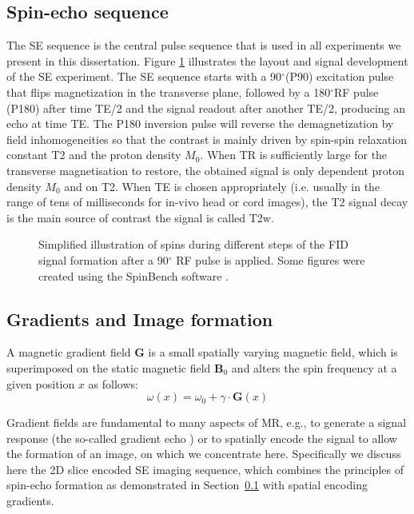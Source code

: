 \subsection{Spin-echo sequence}
\label{sec:chapter2 spin echo}
The {\gls{SE}} sequence is the central pulse sequence that is used in all experiments we present in this dissertation. Figure \ref{fig:chap2 SE sequence} illustrates the layout and signal development of the \gls{SE} experiment. The \gls{SE} sequence starts with a 90$^\circ$(P90) excitation pulse that flips magnetization in the transverse plane, followed by a 180$^\circ$RF pulse (P180) after time TE/2 and the signal readout after another TE/2, producing an echo at time TE. The P180 inversion pulse will reverse the demagnetization by field inhomogeneities so that the contrast is mainly driven by spin-spin relaxation constant T2 and the proton density $M_0$. When TR is sufficiently large for the transverse magnetisation to restore, the obtained signal is only dependent proton density $M_0$ and on T2. When TE is chosen appropriately (i.e. usually in the range of tens of milliseconds for in-vivo head or  cord images), the T2 signal decay is the main source of contrast the signal is called \gls{T2w}.

\begin{figure}[ht]
\centering
{}
\caption{Simplified illustration of spins during different steps of the FID signal formation after a 90$^\circ$ RF pulse is applied. Some figures were created using the SpinBench software \citep{Overall:2007}.}
\label{fig:chap2 SE sequence}
\end{figure}


\subsection{Gradients and Image formation}
A magnetic gradient field $\textbf{G}$ is a small spatially varying magnetic field, which is superimposed on the static magnetic field $\mathbf{B}_{0}$ and alters the spin frequency at a given position $x$ as follows:
\begin{equation}
\omega(x)= \omega_0 + \gamma \cdot \textbf{G}(x)
\end{equation}

Gradient fields are fundamental to many aspects of MR, e.g., to generate a signal response (the so-called gradient echo ) or to spatially encode the signal to allow the formation of an image, on which we concentrate here.  Specifically we discuss here the 2D slice encoded SE imaging sequence, which combines the principles of spin-echo formation as demonstrated in Section~\ref{sec:chapter2 spin echo} with spatial encoding gradients.


